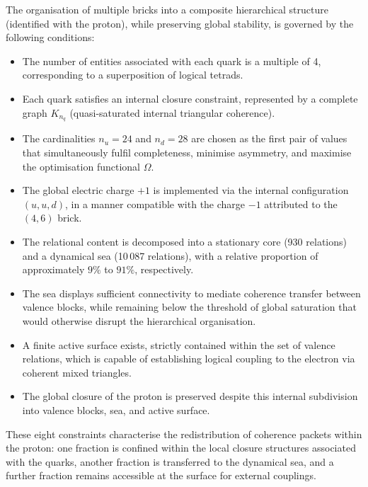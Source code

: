 \documentclass[11pt,a4paper]{article}
\begin{document}
The organisation of multiple bricks into a composite hierarchical structure (identified with the proton), while preserving global stability, is governed by the following conditions:
\begin{itemize}[label=-]
    \item The number of entities associated with each quark is a multiple of 4, corresponding to a superposition of logical tetrads.
    \item Each quark satisfies an internal closure constraint, represented by a complete graph \(K_{n_{q}}\) (quasi-saturated internal triangular coherence).
    \item The cardinalities \(n_{u} = 24\) and \(n_{d} = 28\) are chosen as the first pair of values that simultaneously fulfil completeness, minimise asymmetry, and maximise the optimisation functional \(\Omega\).
    \item The global electric charge \(+1\) is implemented via the internal configuration \((u,u,d)\), in a manner compatible with the charge \(-1\) attributed to the \((4,6)\) brick.
    \item The relational content is decomposed into a stationary core (930 relations) and a dynamical sea (10\,087 relations), with a relative proportion of approximately \(9\%\) to \(91\%\), respectively.
    \item The sea displays sufficient connectivity to mediate coherence transfer between valence blocks, while remaining below the threshold of global saturation that would otherwise disrupt the hierarchical organisation.
    \item A finite active surface exists, strictly contained within the set of valence relations, which is capable of establishing logical coupling to the electron via coherent mixed triangles.
    \item The global closure of the proton is preserved despite this internal subdivision into valence blocks, sea, and active surface.
\end{itemize}
These eight constraints characterise the redistribution of coherence packets within the proton: one fraction is confined within the local closure structures associated with the quarks, another fraction is transferred to the dynamical sea, and a further fraction remains accessible at the surface for external couplings.
\end{document}
